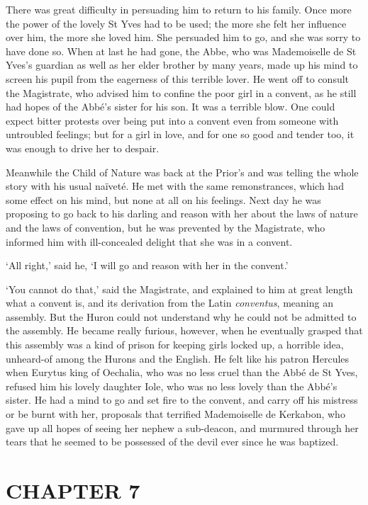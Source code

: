 \documentclass{article}
\begin{document}
\begin{center}
There was great difficulty in persuading him to return to his family. Once more 
the power of the lovely St Yves had to be used; the more she felt her influence 
over him, the more she loved him. She persuaded him to go, and she was sorry to 
have done so. When at last he had gone, the Abbe, who was Mademoiselle de St Yves's 
guardian as well as her elder brother by many years, made up his mind to screen 
his pupil from the eagerness of this terrible lover. He went off to consult the 
Magistrate, who advised him to confine the poor girl in a convent, as he still 
had hopes of the Abbé's sister for his son. It was a terrible blow. One could 
expect bitter protests over being put into a convent even from someone with untroubled 
feelings; but for a girl in love, and for one so good and tender too, it was enough 
to drive her to despair. 

Meanwhile the Child of Nature was back at the Prior's and was telling the whole 
story with his usual naïveté. He met with the same remonstrances, which had some 
effect on his mind, but none at all on his feelings. Next day he was proposing 
to go back to his darling and reason with her about the laws of nature and the 
laws of convention, but he was prevented by the Magistrate, who informed him with 
ill-concealed delight that she was in a convent. 

`All right,' said he, `I will go and reason with her in the convent.' 

`You cannot do that,' said the Magistrate, and explained to him at great length 
what a convent is, and its derivation from the Latin \textit{conventus}, meaning 
an assembly. But the Huron could not understand why he could not be admitted to 
the assembly. He became really furious, however, when he eventually grasped that 
this assembly was a kind of prison for keeping girls locked up, a horrible idea, 
unheard-of among the Hurons and the English. He felt like his patron Hercules when 
Eurytus king of Oechalia, who was no less cruel than the Abbé de St Yves, refused 
him his lovely daughter Iole, who was no less lovely than the Abbé's sister. He 
had a mind to go and set fire to the convent, and carry off his mistress or be 
burnt with her, proposals that terrified Mademoiselle de Kerkabon, who gave up 
all hopes of seeing her nephew a sub-deacon, and murmured through her tears that 
he seemed to be possessed of the devil ever since he was baptized.\pagebreak{} 

\section*{\textbf{CHAPTER 7 }}


\end{center}
\end{document}
